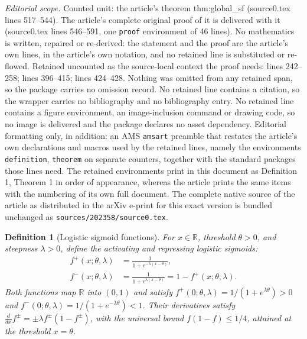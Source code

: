\documentclass[10pt,a4paper]{amsart}
\newtheorem{definition}{Definition}
\begin{document}
\noindent\textit{Editorial scope.} Counted unit: the article's theorem thm:global\_sf (source0.tex lines 517--544). The article's complete original proof of it is delivered with it (source0.tex lines 546--591, one \texttt{proof} environment of 46 lines). No mathematics is written, repaired or re-derived: the statement and the proof are the article's own lines, in the article's own notation, and no retained line is substituted or re-flowed.  Retained uncounted as the source-local context the proof needs: lines 242--258; lines 396--415; lines 424--428.  Nothing was omitted from any retained span, so the package carries no omission record.  No retained line contains a citation, so the wrapper carries no bibliography and no bibliography entry.  No retained line contains a figure environment, an image-inclusion command or drawing code, so no image is delivered and the package declares no asset dependency.  Editorial formatting only, in addition: an AMS \texttt{amsart} preamble that restates the article's own declarations and macros used by the retained lines, namely the environments \texttt{definition}, \texttt{theorem} on separate counters, together with the standard packages those lines need.  The retained environments print in this document as Definition 1, Theorem 1 in order of appearance, whereas the article prints the same items with the numbering of its own full document.  The complete native source of the article as distributed in the arXiv e-print for this exact version is bundled unchanged as \texttt{sources/202358/source0.tex}.
\begin{definition}[Logistic sigmoid functions]
\label{def:logistic}
For $x\in\mathbb{R}$, threshold $\theta>0$, and steepness $\lambda>0$, define the
\emph{activating} and \emph{repressing} logistic sigmoids:
\begin{equation}
\begin{aligned}
f^+(x;\theta,\lambda) &= \frac{1}{1+e^{-\lambda(x-\theta)}}, \\
f^-(x;\theta,\lambda) &= \frac{1}{1+e^{\lambda(x-\theta)}} = 1 - f^+(x;\theta,\lambda).
\end{aligned}
\label{eq:logistic_def}
\end{equation}
Both functions map $\mathbb{R}$ into $(0,1)$ and satisfy
$f^+(0;\theta,\lambda) = 1/(1+e^{\lambda\theta}) > 0$ and
$f^-(0;\theta,\lambda) = 1/(1+e^{-\lambda\theta}) < 1$.
Their derivatives satisfy $\tfrac{d}{dx}f^\pm = \pm\lambda f^\pm(1-f^\pm)$,
with the universal bound $f(1-f)\leq 1/4$, attained at the threshold $x=\theta$.
\end{definition}
\end{document}

